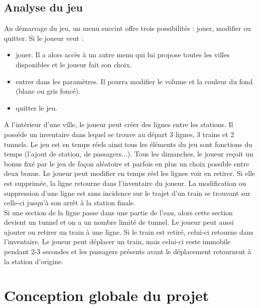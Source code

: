 \documentclass[report, backcover, french, nodocumentinfo]{upmethodology-document}
\begin{document}
		\section{Analyse du jeu}
			\p{}
				Au démarrage du jeu, un menu succint offre trois possibilités : jouer, modifier ou quitter. Si le joueur veut :
				\begin{itemize}
					\item jouer. Il a alors accès à un autre menu qui lui propose toutes les villes disponibles et le joueur fait son choix.
					\item entrer dans les paramètres. Il pourra modifier le volume et la couleur du fond (blanc ou gris foncé).
					\item quitter le jeu.
				\end{itemize}
			\p{}
				A l'intérieur d'une ville, le joueur peut créer des lignes entre les stations. Il possède un inventaire dans lequel se trouve au départ 3 lignes, 3 trains et 2 tunnels. Le jeu est en temps réels ainsi tous les éléments du jeu sont fonctions du temps (l'ajout de station, de passagers...). Tous les dimanches, le joueur reçoit un bonus fixé par le jeu de façon aléatoire et parfois en plus un choix possible entre deux bonus.
			\p{}
				Le joueur peut modifier en temps réel les lignes voir en retirer. Si elle est supprimée, la ligne retourne dans l'inventaire du joueur. La modification ou suppression d'une ligne est sans incidence sur le trajet d'un train se trouvant sur celle-ci jusqu'à son arrêt à la station finale. \\Si une section de la ligne passe dans une partie de l'eau, alors cette section devient un tunnel et on a un nombre limité de tunnel.
			\p{}
				Le joueur peut aussi ajouter ou retirer un train à une ligne. Si le train est retiré, celui-ci retourne dans l'inventaire. Le joueur peut déplacer un train, mais celui-ci reste immobile pendant 2-3 secondes et les passagers présents avant le déplacement retournent à la station d'origine.

	\chapter{Conception globale du projet}
\end{document}
